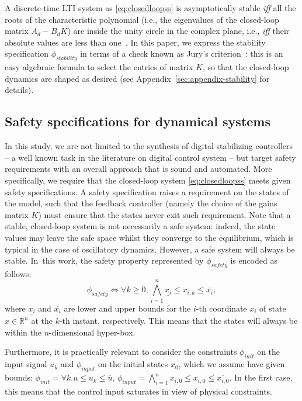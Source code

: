 \documentclass[runningheads,a4paper]{llncs}
\newcommand{\addtodo}[1]{{\color{red} TODO: #1}}
\begin{document}
A discrete-time LTI system as \eqref{eq:closedloopss} is asymptotically stable
\textit{iff} all the roots of the characteristic polynomial (i.e., the
eigenvalues of the closed-loop matrix $A_d - B_d K$) are inside the unity
circle in the complex plane, i.e., \textit{iff} their absolute values are
less than one~\cite{astrom1997computer}.  In this paper, we express the
stability specification $\phi_{stability}$ in terms of a check known as
Jury's criterion~\cite{fadali}: this is an easy algebraic formula to select
the entries of matrix $K$, so that the closed-loop dynamics are shaped as
desired (see Appendix~\ref{sec:appendix-stability} for details).


\subsection{Safety specifications for dynamical systems}
\label{ssec:safety}

In this study, we are not limited to the synthesis of digital stabilizing
controllers -- a well known task in the literature on digital control system
-- but target safety requirements with an overall approach that is sound and
automated.  More specifically, we require that the closed-loop system
\eqref{eq:closedloopss} meets given safety specifications.  A safety
specification raises a requirement on the states of the model, such that the
feedback controller (namely the choice of the gains matrix $K$) must ensure that
the states never exit such requirement.  Note that a stable, closed-loop
system is not necessarily a safe system: indeed, the state values may leave
the safe space whilst they converge to the equilibrium, which is typical in
the case of oscillatory dynamics.  However, a safe system will always be
stable.  In~this work, the safety property represented by $\phi_{safety}$ is
encoded as follows:
%
\begin{equation}
\label{eq:safetyliteral}
\phi_{safety}\iff \forall k\geq 0, \bigwedge_{i=1}^{n}{\underline{x_{i}} \leq x_{i,k} \leq \overline{x_{i}}},
\end{equation}
%
%
where $\underline{x_{i}}$ and $\overline{x_{i}}$ are lower and upper bounds
for the $i$-th coordinate $x_{i}$ of state $x\in \mathbb R^n$ at the $k$-th
instant, respectively.  This means that the states will always be within the
$n$-dimensional hyper-box.

Furthermore, it is practically relevant to consider the 
constraints $\phi_{init}$ on the input
signal $u_{k}$ and $\phi_{input}$ on the initial states $x_0$,
which we assume have given bounds:
$\phi_{init} = {\forall k.\underline{u} \leq u_{k} \leq \overline{u}} $, 
$\phi_{input} = \bigwedge_{i=1}^{n} \underline{x_{i,0}} \leq x_{i,0} \leq \overline{x_{i,0}}.$
In the first case, this means that the control input saturates in view of
physical constraints.
\end{document}
